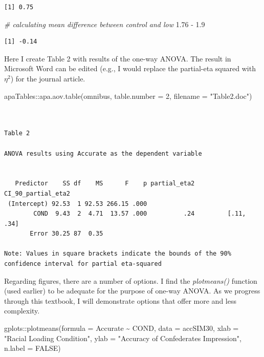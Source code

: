\documentclass[
  11pt,
]{book}
\newenvironment{Shaded}{\begin{snugshade}}{\end{snugshade}}
\newcommand{\AttributeTok}[1]{\textcolor[rgb]{0.77,0.63,0.00}{#1}}
\newcommand{\CommentTok}[1]{\textcolor[rgb]{0.56,0.35,0.01}{\textit{#1}}}
\newcommand{\ConstantTok}[1]{\textcolor[rgb]{0.00,0.00,0.00}{#1}}
\newcommand{\DecValTok}[1]{\textcolor[rgb]{0.00,0.00,0.81}{#1}}
\newcommand{\FloatTok}[1]{\textcolor[rgb]{0.00,0.00,0.81}{#1}}
\newcommand{\FunctionTok}[1]{\textcolor[rgb]{0.00,0.00,0.00}{#1}}
\newcommand{\NormalTok}[1]{#1}
\newcommand{\SpecialCharTok}[1]{\textcolor[rgb]{0.00,0.00,0.00}{#1}}
\newcommand{\StringTok}[1]{\textcolor[rgb]{0.31,0.60,0.02}{#1}}
\begin{document}
\begin{verbatim}
[1] 0.75
\end{verbatim}

\begin{Shaded}
\begin{Highlighting}[]
\CommentTok{\# calculating mean difference between control and low}
\FloatTok{1.76} \SpecialCharTok{{-}} \FloatTok{1.9}
\end{Highlighting}
\end{Shaded}

\begin{verbatim}
[1] -0.14
\end{verbatim}

Here I create Table 2 with results of the one-way ANOVA. The result in Microsoft Word can be edited (e.g., I would replace the partial-eta squared with \(\eta^2\)) for the journal article.

\begin{Shaded}
\begin{Highlighting}[]
\NormalTok{apaTables}\SpecialCharTok{::}\FunctionTok{apa.aov.table}\NormalTok{(omnibus, }\AttributeTok{table.number =} \DecValTok{2}\NormalTok{, }\AttributeTok{filename =} \StringTok{"Table2.doc"}\NormalTok{)}
\end{Highlighting}
\end{Shaded}

\begin{verbatim}


Table 2 

ANOVA results using Accurate as the dependent variable
 

   Predictor    SS df    MS      F    p partial_eta2 CI_90_partial_eta2
 (Intercept) 92.53  1 92.53 266.15 .000                                
        COND  9.43  2  4.71  13.57 .000          .24         [.11, .34]
       Error 30.25 87  0.35                                            

Note: Values in square brackets indicate the bounds of the 90% confidence interval for partial eta-squared 
\end{verbatim}

Regarding figures, there are a number of options. I find the \emph{plotmeans()} function (used earlier) to be adequate for the purpose of one-way ANOVA. As we progress through this textbook, I will demonstrate options that offer more and less complexity.

\begin{Shaded}
\begin{Highlighting}[]
\NormalTok{gplots}\SpecialCharTok{::}\FunctionTok{plotmeans}\NormalTok{(}\AttributeTok{formula =}\NormalTok{ Accurate }\SpecialCharTok{\textasciitilde{}}\NormalTok{ COND, }\AttributeTok{data =}\NormalTok{ accSIM30, }\AttributeTok{xlab =} \StringTok{"Racial Loading Condition"}\NormalTok{,}
    \AttributeTok{ylab =} \StringTok{"Accuracy of Confederate\textquotesingle{}s Impression"}\NormalTok{, }\AttributeTok{n.label =} \ConstantTok{FALSE}\NormalTok{)}
\end{Highlighting}
\end{Shaded}
\end{document}

